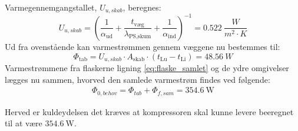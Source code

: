 \documentclass[../Hovedrapport.tex]{subfiles}
\begin{document}
Varmegennemgangstallet, $U_{u,skab}$, beregnes:
\begin{equation}
    U_{u,skab} = \left( \frac{1}{\alpha_\text{ud}} + \frac{t_\text{væg}}{\lambda_\text{PS,skum}} + \frac{1}{\alpha_\text{ind}} \right)^{-1} = \SI{0,522}{\frac{W}{m^2\cdot K}}
\end{equation}
Ud fra ovenstående kan varmestrømmen gennem væggene nu bestemmes til:
\begin{equation}
    \label{eq:varmestroem_gennem_vaeg}
    \Phi_\text{tab} = U_{u,skab} \cdot A_\text{skab} \cdot \left( t_\text{Lu} - t_\text{Li} \right) = \SI{48,56}{W}
\end{equation}
Varmestrømmene fra flaskerne ligning \ref{eq:flaske_samlet} og de ydre omgivelser lægges nu sammen, hvorved den samlede varmestrøm findes ved følgende:
\begin{align}
    \label{eq:samletvarmestroemfraudregninger}
    \Phi_{0,behov}=\Phi_{tab}+\Phi_{f,sam}=\SI{354,6}{\watt}
\end{align}

Herved er kuldeydelsen det kræves at kompressoren skal kunne levere beeregnet til at være $\SI{354,6}{\watt}$.
\end{document}

